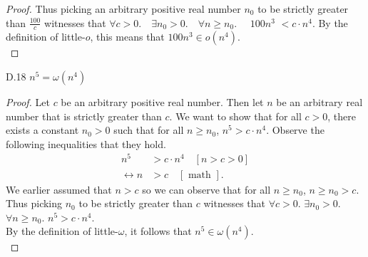 \documentclass[10pt]{article}
\begin{document}
\begin{enumerate}[label={}]
\begin{proof}
                  Thus picking an arbitrary positive real number $n_0$ to be strictly greater than $\frac{100}{c}$ witnesses that $\forall c>0 . \quad \exists n_0>0 . \quad \forall n \geq n_0 . \quad$ $100 n^3$ $< c \cdot n^4$. By the definition of little-$o$, this means that $100n^3 \in o\left(n^4\right)$.\\
            \end{proof}
            D.18 $n^5=\omega\left(n^4\right)$
            \begin{proof}
                  Let $c$ be an arbitrary positive real number. Then let $n$ be an arbitrary real number that is strictly greater than $c$.
                  We want to show that for all $c>0$, there exists a constant $n_0 > 0$ such that for all $n\geq n_0$, $n^5>c \cdot n^4$.
                  Observe the following inequalities that they hold.
                  $$
                        \begin{aligned}
                              n^5                   & >c \cdot n^4 \quad {\left[n>c>0\right] } \\
                              \longleftrightarrow n & >c \quad[\text { math }].
                        \end{aligned}
                  $$
                  We earlier assumed that $n>c$ so we can observe that for all $n\geq n_0$, $n\geq n_0>c$.
                  Thus picking $n_0$ to be strictly greater than $c$ witnesses that $\forall c>0$. $\exists n_0>0$. $\forall n \geq n_0$. $n^5>c \cdot n^4$.\\
                  By the definition of little-$\omega$, it follows that $n^5 \in \omega\left(n^4\right)$.\\
            \end{proof}
            \newpage


\end{enumerate}
\end{document}
